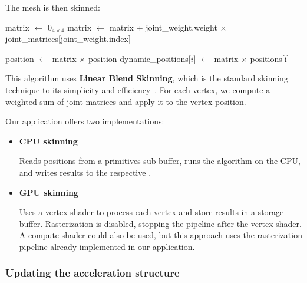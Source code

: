 The mesh is then skinned:

\begin{algorithm}[H]

\caption{Skinning a model}\label{alg:skinning}

\begin{algorithmic}[1]
        \State matrix $\gets$ $0_{4 \times 4}$
            \State matrix $\gets$ matrix + joint\_weight.weight $\times$ joint\_matrices[joint\_weight.index]
        \EndFor

        \State position $\gets$ matrix $\times$ position
        \State dynamic\_positions[$i$] $\gets$ matrix $\times$ positions[i]
    \EndFor
\end{algorithmic}

\end{algorithm}

This algorithm uses \textbf{Linear Blend Skinning}, which is the standard skinning technique to its simplicity and efficiency~\parencite{linear-blend-skinning}. For each vertex, we compute a weighted sum of joint matrices and apply it to the vertex position.

Our application offers two implementations:

\begin{itemize}
    \item \textbf{CPU skinning}
    
    Reads positions from a primitives  sub-buffer, runs the algorithm on the CPU, and writes results to the respective .

    \item \textbf{GPU skinning}
    
    Uses a vertex shader to process each vertex and store results in a storage buffer. Rasterization is disabled, stopping the pipeline after the vertex shader. A compute shader could also be used, but this approach uses the rasterization pipeline already implemented in our application.

\end{itemize}

\subsubsection{Updating the acceleration structure}

